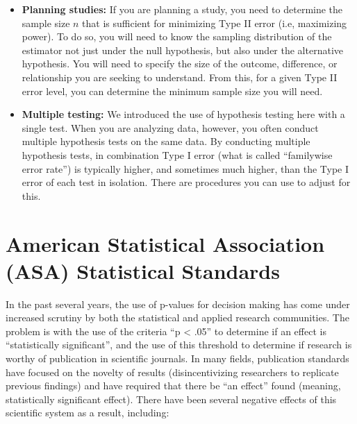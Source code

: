 \documentclass[
  letterpaper,
  DIV=11,
  numbers=noendperiod]{scrreprt}
\providecommand{\tightlist}{%
  \setlength{\itemsep}{0pt}\setlength{\parskip}{0pt}}\usepackage{longtable,booktabs,array}
\theoremstyle{definition}
\theoremstyle{remark}
\begin{document}
\begin{itemize}
\tightlist
\item
  \textbf{Planning studies:} If you are planning a study, you need to
  determine the sample size \(n\) that is sufficient for minimizing Type
  II error (i.e, maximizing power). To do so, you will need to know the
  sampling distribution of the estimator not just under the null
  hypothesis, but also under the alternative hypothesis. You will need
  to specify the size of the outcome, difference, or relationship you
  are seeking to understand. From this, for a given Type II error level,
  you can determine the minimum sample size you will need.
\item
  \textbf{Multiple testing:} We introduced the use of hypothesis testing
  here with a single test. When you are analyzing data, however, you
  often conduct multiple hypothesis tests on the same data. By
  conducting multiple hypothesis tests, in combination Type I error
  (what is called ``familywise error rate'') is typically higher, and
  sometimes much higher, than the Type I error of each test in
  isolation. There are procedures you can use to adjust for this.
\end{itemize}

\hypertarget{american-statistical-association-asa-statistical-standards}{%
\section{American Statistical Association (ASA) Statistical
Standards}\label{american-statistical-association-asa-statistical-standards}}

In the past several years, the use of p-values for decision making has
come under increased scrutiny by both the statistical and applied
research communities. The problem is with the use of the criteria ``p
\textless{} .05'' to determine if an effect is ``statistically
significant'', and the use of this threshold to determine if research is
worthy of publication in scientific journals. In many fields,
publication standards have focused on the novelty of results
(disincentivizing researchers to replicate previous findings) and have
required that there be ``an effect'' found (meaning, statistically
significant effect). There have been several negative effects of this
scientific system as a result, including:
\end{document}

